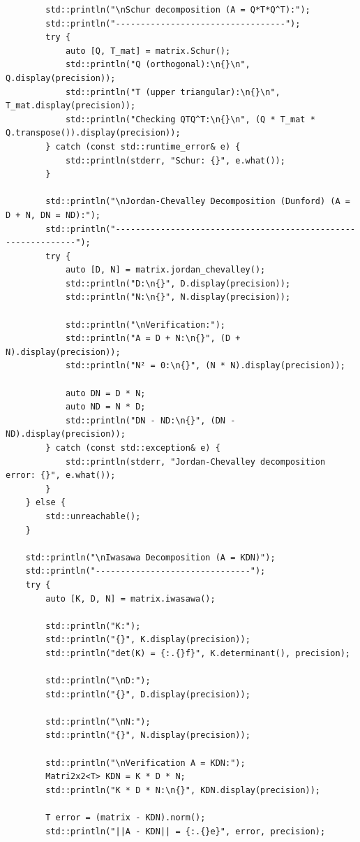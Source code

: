 \documentclass[11pt]{article}
\begin{document}
\begin{lstlisting}
        std::println("\nSchur decomposition (A = Q*T*Q^T):");
        std::println("----------------------------------");
        try {
            auto [Q, T_mat] = matrix.Schur();
            std::println("Q (orthogonal):\n{}\n", Q.display(precision));
            std::println("T (upper triangular):\n{}\n", T_mat.display(precision));
            std::println("Checking QTQ^T:\n{}\n", (Q * T_mat * Q.transpose()).display(precision));
        } catch (const std::runtime_error& e) {
            std::println(stderr, "Schur: {}", e.what());
        }
        
        std::println("\nJordan-Chevalley Decomposition (Dunford) (A = D + N, DN = ND):");
        std::println("--------------------------------------------------------------");
        try {
            auto [D, N] = matrix.jordan_chevalley();
            std::println("D:\n{}", D.display(precision));
            std::println("N:\n{}", N.display(precision));
            
            std::println("\nVerification:");
            std::println("A = D + N:\n{}", (D + N).display(precision));
            std::println("N² = 0:\n{}", (N * N).display(precision));
            
            auto DN = D * N;
            auto ND = N * D;
            std::println("DN - ND:\n{}", (DN - ND).display(precision));            
        } catch (const std::exception& e) {
            std::println(stderr, "Jordan-Chevalley decomposition error: {}", e.what());
        }
    } else {
        std::unreachable();
    }

    std::println("\nIwasawa Decomposition (A = KDN)");
    std::println("-------------------------------");
    try {
        auto [K, D, N] = matrix.iwasawa();
        
        std::println("K:");
        std::println("{}", K.display(precision));
        std::println("det(K) = {:.{}f}", K.determinant(), precision);
        
        std::println("\nD:");
        std::println("{}", D.display(precision));
        
        std::println("\nN:");
        std::println("{}", N.display(precision));
        
        std::println("\nVerification A = KDN:");
        Matri2x2<T> KDN = K * D * N;
        std::println("K * D * N:\n{}", KDN.display(precision));
        
        T error = (matrix - KDN).norm();
        std::println("||A - KDN|| = {:.{}e}", error, precision);
        

\end{lstlisting}
\end{document}
